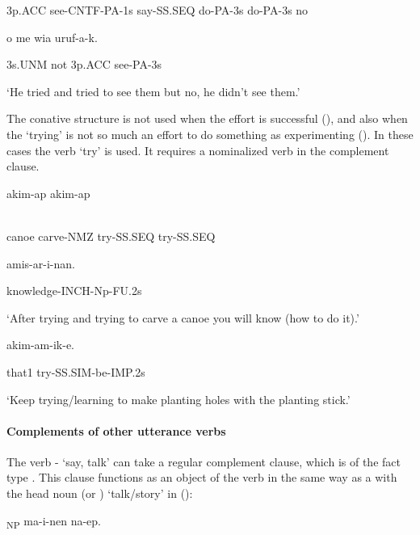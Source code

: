 3p.ACC  see-CNTF-PA-1s  say-SS.SEQ  do-PA-3s  do-PA-3s  no

o  me  wia  uruf-a-k.

3s.UNM  not  3p.ACC  see-PA-3s

`He tried and tried to see them but no, he didn't see them.'

The conative structure is not used when the effort is successful (), and also when the `trying' is not so much an effort to do something as experimenting ().  In these cases the verb  `try' is used. It requires a nominalized verb in the complement clause. 

\ea%
\label{ex:x375}
  akim-ap  akim-ap \\
      \\
\glt
\z

canoe  carve-NMZ  try-SS.SEQ  try-SS.SEQ

amis-ar-i-nan.

knowledge-INCH-Np-FU.2s

`After trying and trying to carve a canoe you will know (how to do it).'

\ea%
\label{ex:x376}
  akim-am-ik-e.

that1  try-SS.SIM-be-IMP.2s

`Keep trying/learning to make planting holes with the planting stick.'

\paragraph[Complements of other utterance verbs ]{Complements of other utterance verbs} 
\hypertarget{RefHeading23541935131865}{}
The verb - `say, talk' can take a regular complement clause, which is of the fact type \citep[389]{Dixon2010b}. This clause functions as an object of the verb in the same way as a  with the head noun  (or ) `talk/story' in ():

\ea%
\label{ex:x1595}
\gll [Opora  gelemuta=ko]\textsubscript{NP}  ma-i-nen  na-ep. \\
      \\
\glt
\z

